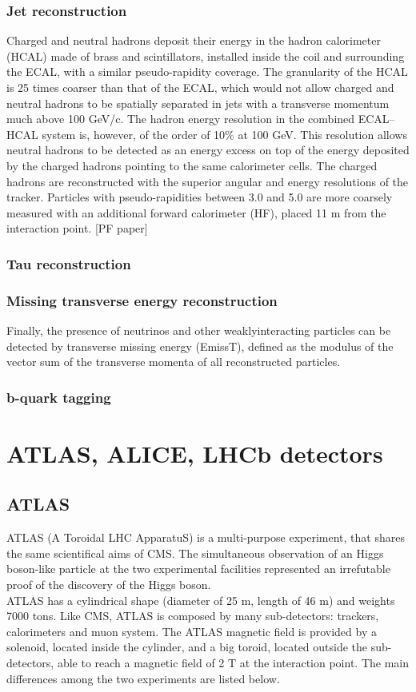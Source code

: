 \subsubsection{Jet reconstruction}
Charged and neutral hadrons deposit their energy in the hadron calorimeter (HCAL) made
of brass and scintillators, installed inside the coil and surrounding the ECAL, with a similar
pseudo-rapidity coverage. The granularity of the HCAL is 25 times coarser than that of
the ECAL, which would not allow charged and neutral hadrons to be spatially separated in
jets with a transverse momentum much above 100 GeV/c. The hadron energy resolution in
the combined ECAL–HCAL system is, however, of the order of 10\% at 100 GeV. This resolution
allows neutral hadrons to be detected as an energy excess on top of the energy deposited
by the charged hadrons pointing to the same calorimeter cells. The charged hadrons are reconstructed
with the superior angular and energy resolutions of the tracker. Particles with
pseudo-rapidities between 3.0 and 5.0 are more coarsely measured with an additional forward
calorimeter (HF), placed 11 m from the interaction point.
[PF paper]
\subsubsection{Tau reconstruction}
\subsubsection{Missing transverse energy reconstruction}
Finally, the presence of neutrinos and other weaklyinteracting
particles can be detected by transverse missing energy (EmissT), defined as the modulus
of the vector sum of the transverse momenta of all reconstructed particles.
\subsubsection{b-quark tagging}


\section{ATLAS, ALICE, LHCb detectors}

\subsection{ATLAS}
ATLAS (A Toroidal LHC ApparatuS) is a multi-purpose experiment, that shares the same scientifical aims of CMS. The simultaneous observation of an Higgs boson-like particle at the two experimental facilities represented an irrefutable proof of the discovery of the Higgs boson.\\
ATLAS has a cylindrical shape (diameter of 25 m, length of 46 m) and weights 7000 tons. Like CMS, ATLAS is composed by many sub-detectors: trackers, calorimeters and muon system. The ATLAS magnetic field is provided by a solenoid, located inside the cylinder, and a big toroid, located outside the sub-detectors, able to reach a magnetic field of 2 T at the interaction point. The main differences among the two experiments are listed below.

